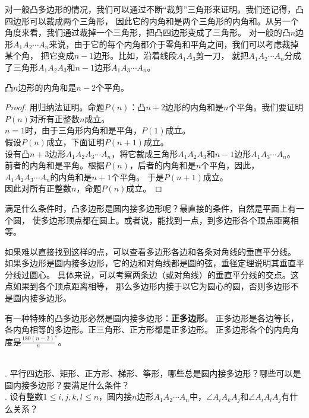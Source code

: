 \documentclass[12pt,UTF8,fontset=none]{ctexbook}
\begin{document}
对一般凸多边形的情况，我们可以通过不断“裁剪”三角形来证明。我们还记得，凸四边形可以裁成两个三角形，
因此它的内角和是两个三角形的内角和。从另一个角度来看，我们通过裁掉一个三角形，把凸四边形变成了三角形。
对一般的凸$n$边形$A_1A_2\cdots A_n$来说，由于它的每个内角都介于零角和平角之间，我们可以考虑裁掉某个角，
把它变成$n-1$边形。比如，沿着线段$A_1A_3$剪一刀，
就把$A_1A_2\cdots A_n$分成了三角形$A_1A_2A_3$和$n-1$边形$A_1A_3\cdots A_n$。

\begin{tm}\label{tm:1-4-0}
    凸$n$边形的内角和是$n-2$个平角。
\end{tm}
\begin{proof}
    用归纳法证明。命题$P(n)$：凸$n+2$边形的内角和是$n$个平角。我们要证明$P(n)$对所有正整数$n$成立。\\
    $n=1$时，由于三角形内角和是平角，$P(1)$成立。\\
    假设$P(n)$成立，下面证明$P(n+1)$成立。\\
    设有凸$n+3$边形$A_1A_2A_3\cdots A_n$，将它裁成三角形$A_1A_2A_3$和$n-1$边形$A_1A_3\cdots A_n$。
    前者的内角和是平角。根据$P(n)$，后者的内角和是$n$个平角，因此，$A_1A_2A_3\cdots A_n$的内角和是$n+1$个平角。
    于是$P(n+1)$成立。\\
    因此对所有正整数$n$，命题$P(n)$成立。
\end{proof}

满足什么条件时，凸多边形是圆内接多边形呢？最直接的条件，自然是平面上有一个圆，
使多边形顶点都在圆上。或者说，能找到一点，到多边形各个顶点距离相等。

如果难以直接找到这样的点，可以查看多边形各边和各条对角线的垂直平分线。
如果多边形是圆内接多边形，它的边和对角线都是圆的弦，垂径定理说明其垂直平分线过圆心。
具体来说，可以考察两条边（或对角线）的垂直平分线的交点。这点如果到各个顶点距离相等，
那么多边形内接于以它为圆心的圆，否则多边形不是圆内接多边形。

有一种特殊的凸多边形必然是圆内接多边形：\textbf{正多边形}。
正多边形是各边等长，各内角相等的多边形。正三角形、正方形都是正多边形。
正多边形各个的内角角度是$\frac{180(n-2)}{n}^\circ$。

\begin{xt}\label{xt:1-4-0}
    \mbox{}\\
    . 平行四边形、矩形、正方形、梯形、筝形，哪些总是圆内接多边形？哪些可以是圆内接多边形？要满足什么条件？\\
    . 设有整数$1 \leqslant i,j,k,l \leqslant n$，圆内接$n$边形$A_1A_2\cdots A_n$中，$\angle A_iA_kA_j$和$\angle A_iA_lA_j$有什么关系？
\end{xt}
\end{document}
